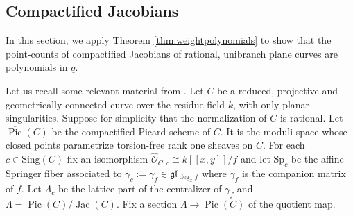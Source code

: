 \documentclass{amsart}
\numberwithin{equation}{section}
\theoremstyle{definition}
\def\Sp{{\mathrm{Sp}}}
\DeclareMathOperator{\Jac}{Jac}
\DeclareMathOperator{\Pic}{Pic}
\newcommand{\cO}{\mathcal{O}}
\newcommand{\fl}{\mathfrak{l}}
\newcommand{\fg}{\mathfrak{g}}
\newcommand{\bPic}{\overline{\Pic}}
\begin{document}

\subsection{Compactified Jacobians}
\label{sec:cptjac}
In this section, we apply Theorem \ref{thm:weightpolynomials} to show that the point-counts of compactified Jacobians of rational, unibranch plane curves are polynomials in $q$.

Let us recall some relevant material from \cite{Laumon}. Let $C$ be a reduced, projective and geometrically connected curve over the residue field $k$, with only planar singularities. Suppose for simplicity that the normalization of $C$ is rational. Let $\bPic(C)$ be the compactified Picard scheme of $C$. It is the moduli space whose closed points parametrize torsion-free rank one sheaves on $C$. For each $c\in \text{Sing}(C)$ fix an isomorphism $\widehat{\cO}_{C,c}\cong k[[x,y]]/f$ and let $\Sp_c$ be the affine Springer fiber associated to $\gamma_c:=\gamma_f\in \fg\fl_{\deg_x f}$ where $\gamma_f$ is the companion matrix of $f$. Let $\Lambda_c$ be the lattice part of the centralizer of $\gamma_f$ and $\Lambda=\Pic(C)/\Jac(C)$. Fix a section $\Lambda\to \Pic(C)$ of the quotient map.
\end{document}
